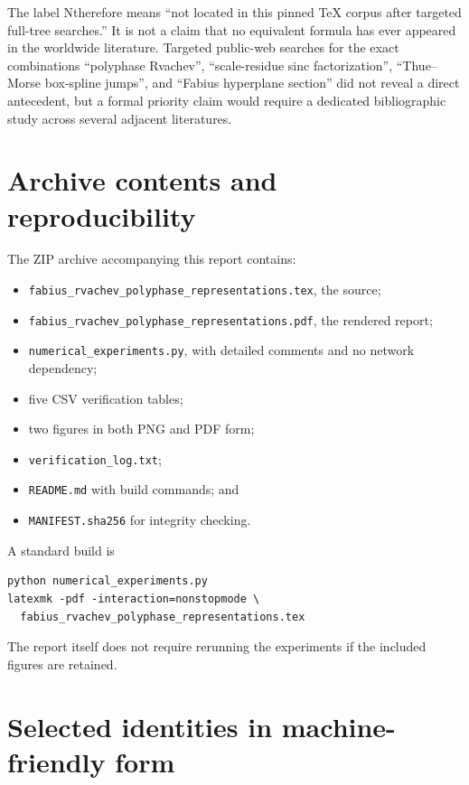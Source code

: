 \documentclass[11pt]{article}
\theoremstyle{definition}
\theoremstyle{remark}
\newcommand{\statusnew}{\textsf{N}}
\begin{document}
The label \statusnew therefore means ``not located in this pinned TeX corpus
after targeted full-tree searches.''  It is not a claim that no equivalent
formula has ever appeared in the worldwide literature.  Targeted public-web
searches for the exact combinations ``polyphase Rvachev'', ``scale-residue sinc
factorization'', ``Thue--Morse box-spline jumps'', and ``Fabius hyperplane
section'' did not reveal a direct antecedent, but a formal priority claim would
require a dedicated bibliographic study across several adjacent literatures.

\section{Archive contents and reproducibility}
\label{p5:app:archive}

The ZIP archive accompanying this report contains:
\begin{itemize}
\item \texttt{fabius\_rvachev\_polyphase\_representations.tex}, the source;
\item \texttt{fabius\_rvachev\_polyphase\_representations.pdf}, the rendered report;
\item \texttt{numerical\_experiments.py}, with detailed comments and no network dependency;
\item five CSV verification tables;
\item two figures in both PNG and PDF form;
\item \texttt{verification\_log.txt};
\item \texttt{README.md} with build commands; and
\item \texttt{MANIFEST.sha256} for integrity checking.
\end{itemize}

A standard build is
\begin{lstlisting}[style=python]
python numerical_experiments.py
latexmk -pdf -interaction=nonstopmode \
  fabius_rvachev_polyphase_representations.tex
\end{lstlisting}
The report itself does not require rerunning the experiments if the included
figures are retained.

\section{Selected identities in machine-friendly form}
\label{p5:app:machine-identities}
\end{document}
